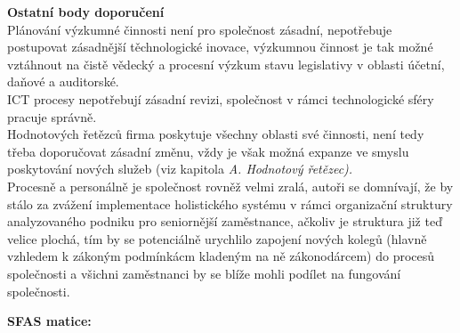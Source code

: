 \noindent\textbf{Ostatní body doporučení}\\

Plánování výzkumné činnosti není pro společnost zásadní, nepotřebuje postupovat zásadnější těchnologické inovace, výzkumnou činnost je tak možné vztáhnout na čistě vědecký a procesní výzkum stavu legislativy v oblasti účetní, daňové a auditorské.\\

ICT procesy nepotřebují zásadní revizi, společnost v rámci technologické sféry pracuje správně.\\

Hodnotových řetězců firma poskytuje všechny oblasti své činnosti, není tedy třeba doporučovat zásadní změnu, vždy je však možná expanze ve smyslu poskytování nových služeb (viz kapitola \textit{A. Hodnotový řetězec).}\\

Procesně a personálně je společnost rovněž velmi zralá, autoři se domnívají, že by stálo za zvážení implementace holistického systému v rámci organizační struktury analyzovaného podniku pro seniornější zaměstnance, ačkoliv je struktura již teď velice plochá, tím by se potenciálně urychlilo zapojení nových kolegů (hlavně vzhledem k zákoným podmínkácm kladeným na ně zákonodárcem) do procesů společnosti a všichni zaměstnanci by se blíže mohli podílet na fungování společnosti.\\






\newpage

\noindent\textbf{SFAS matice:}


